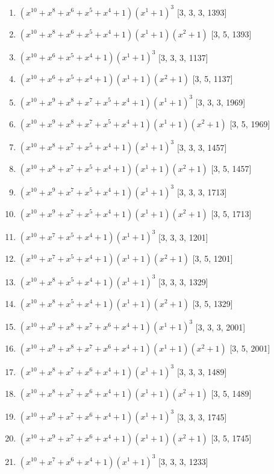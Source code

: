 \documentclass[10pt,twocolumn]{article}
\begin{document}
\begin{enumerate}
\item $(x^{10} + x^{8} + x^{6} + x^{5} + x^{4} + 1)(x^{1} + 1)^{3}$  [3, 3, 3, 1393]
\item $(x^{10} + x^{8} + x^{6} + x^{5} + x^{4} + 1)(x^{1} + 1)(x^{2} + 1)$  [3, 5, 1393]
\item $(x^{10} + x^{6} + x^{5} + x^{4} + 1)(x^{1} + 1)^{3}$  [3, 3, 3, 1137]
\item $(x^{10} + x^{6} + x^{5} + x^{4} + 1)(x^{1} + 1)(x^{2} + 1)$  [3, 5, 1137]
\item $(x^{10} + x^{9} + x^{8} + x^{7} + x^{5} + x^{4} + 1)(x^{1} + 1)^{3}$  [3, 3, 3, 1969]
\item $(x^{10} + x^{9} + x^{8} + x^{7} + x^{5} + x^{4} + 1)(x^{1} + 1)(x^{2} + 1)$  [3, 5, 1969]
\item $(x^{10} + x^{8} + x^{7} + x^{5} + x^{4} + 1)(x^{1} + 1)^{3}$  [3, 3, 3, 1457]
\item $(x^{10} + x^{8} + x^{7} + x^{5} + x^{4} + 1)(x^{1} + 1)(x^{2} + 1)$  [3, 5, 1457]
\item $(x^{10} + x^{9} + x^{7} + x^{5} + x^{4} + 1)(x^{1} + 1)^{3}$  [3, 3, 3, 1713]
\item $(x^{10} + x^{9} + x^{7} + x^{5} + x^{4} + 1)(x^{1} + 1)(x^{2} + 1)$  [3, 5, 1713]
\item $(x^{10} + x^{7} + x^{5} + x^{4} + 1)(x^{1} + 1)^{3}$  [3, 3, 3, 1201]
\item $(x^{10} + x^{7} + x^{5} + x^{4} + 1)(x^{1} + 1)(x^{2} + 1)$  [3, 5, 1201]
\item $(x^{10} + x^{8} + x^{5} + x^{4} + 1)(x^{1} + 1)^{3}$  [3, 3, 3, 1329]
\item $(x^{10} + x^{8} + x^{5} + x^{4} + 1)(x^{1} + 1)(x^{2} + 1)$  [3, 5, 1329]
\item $(x^{10} + x^{9} + x^{8} + x^{7} + x^{6} + x^{4} + 1)(x^{1} + 1)^{3}$  [3, 3, 3, 2001]
\item $(x^{10} + x^{9} + x^{8} + x^{7} + x^{6} + x^{4} + 1)(x^{1} + 1)(x^{2} + 1)$  [3, 5, 2001]
\item $(x^{10} + x^{8} + x^{7} + x^{6} + x^{4} + 1)(x^{1} + 1)^{3}$  [3, 3, 3, 1489]
\item $(x^{10} + x^{8} + x^{7} + x^{6} + x^{4} + 1)(x^{1} + 1)(x^{2} + 1)$  [3, 5, 1489]
\item $(x^{10} + x^{9} + x^{7} + x^{6} + x^{4} + 1)(x^{1} + 1)^{3}$  [3, 3, 3, 1745]
\item $(x^{10} + x^{9} + x^{7} + x^{6} + x^{4} + 1)(x^{1} + 1)(x^{2} + 1)$  [3, 5, 1745]
\item $(x^{10} + x^{7} + x^{6} + x^{4} + 1)(x^{1} + 1)^{3}$  [3, 3, 3, 1233]

\end{enumerate}
\end{document}
